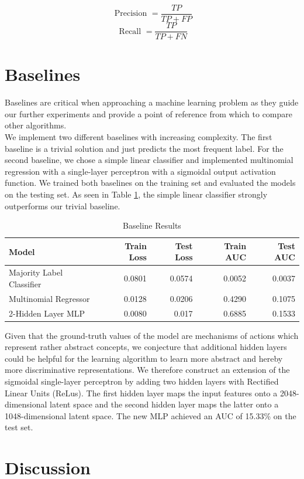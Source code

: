 \documentclass[bsc,frontabs,twoside,singlespacing,parskip,deptreport]{infthesis}     %
\let\Oldsection\section
\renewcommand{\section}{\FloatBarrier\Oldsection}
\begin{document}
\[\text { Precision }=\frac{TP}{TP+ FP}\]
\[\text { Recall }=\frac{TP}{TP+ FN}\]



\section{Baselines}
Baselines are critical when approaching a machine learning problem as they guide our further experiments and provide a point of reference from which to compare other algorithms.\\
We implement two different baselines with increasing complexity. The first baseline is a trivial solution and just predicts the most frequent label.
For the second baseline, we chose a simple linear classifier and implemented multinomial regression with a single-layer perceptron with a sigmoidal output activation function.
We trained both baselines on the training set and evaluated the models on the testing set. As seen in Table \ref{baseline_table}, the simple linear classifier strongly outperforms our trivial baseline.

\begin{table}[h!]
\centering
\begin{tabular}{lrrrr}
\toprule
{Model} &  Train Loss &  Test Loss & Train AUC & Test AUC  \\
\midrule
Majority Label Classifier &  0.0801 & 0.0574 & 0.0052 & 0.0037  \\
Multinomial Regressor  & 0.0128 & 0.0206 & 0.4290 & 0.1075 \\
2-Hidden Layer MLP & 0.0080 & 0.017 & 0.6885 & 0.1533 \\
\bottomrule
\end{tabular}
\caption{Baseline Results}\label{baseline_table}
\end{table}

Given that the ground-truth values of the model are mechanisms of actions which represent rather abstract concepts, we conjecture that additional hidden layers could be helpful for the learning algorithm to learn more abstract and hereby more discriminative representations. 
We therefore construct an extension of the sigmoidal single-layer perceptron by adding two hidden layers with Rectified Linear Units (ReLus). The first hidden layer maps the input features onto a 2048-dimensional latent space and the second hidden layer maps the latter onto a 1048-dimensional latent space. The new MLP achieved an AUC of 15.33\% on the test set.
\section{Discussion}
\end{document}
